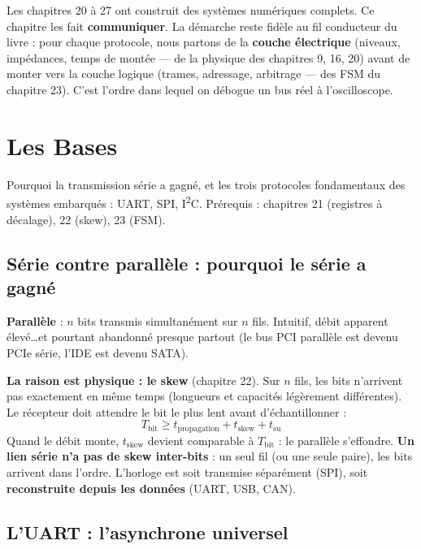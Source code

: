 \documentclass[12pt,a4paper,twoside]{book}
\begin{document}
Les chapitres 20 à 27 ont construit des systèmes numériques complets. Ce chapitre les fait \textbf{communiquer}. La démarche reste fidèle au fil conducteur du livre : pour chaque protocole, nous partons de la \textbf{couche électrique} (niveaux, impédances, temps de montée --- de la physique des chapitres 9, 16, 20) avant de monter vers la couche logique (trames, adressage, arbitrage --- des FSM du chapitre 23). C'est l'ordre dans lequel on débogue un bus réel à l'oscilloscope.

\section{Les Bases}

\begin{bases}
Pourquoi la transmission série a gagné, et les trois protocoles fondamentaux des systèmes embarqués : UART, SPI, I\textsuperscript{2}C. Prérequis : chapitres 21 (registres à décalage), 22 (skew), 23 (FSM).
\end{bases}

\subsection{Série contre parallèle : pourquoi le série a gagné}

\begin{formule}
\textbf{Parallèle} : $n$ bits transmis simultanément sur $n$ fils. Intuitif, débit apparent élevé\ldots et pourtant abandonné presque partout (le bus PCI parallèle est devenu PCIe série, l'IDE est devenu SATA).

\textbf{La raison est physique : le skew} (chapitre 22). Sur $n$ fils, les bits n'arrivent pas exactement en même temps (longueurs et capacités légèrement différentes). Le récepteur doit attendre le bit le plus lent avant d'échantillonner :
\[
T_{\text{bit}} \geq t_{\text{propagation}} + t_{\text{skew}} + t_{\text{su}}
\]
Quand le débit monte, $t_{\text{skew}}$ devient comparable à $T_{\text{bit}}$ : le parallèle s'effondre. \textbf{Un lien série n'a pas de skew inter-bits} : un seul fil (ou une seule paire), les bits arrivent dans l'ordre. L'horloge est soit transmise séparément (SPI), soit \textbf{reconstruite depuis les données} (UART, USB, CAN).
\end{formule}

\subsection{L'UART : l'asynchrone universel}
\end{document}
